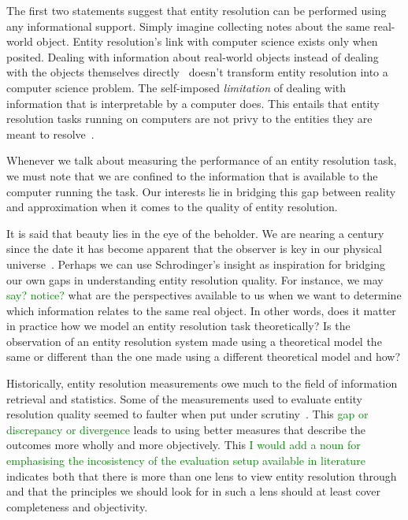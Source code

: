 \documentclass[journal]{IEEEtran}
\begin{document}
    The first two statements suggest that entity resolution can be performed
    using any informational support.
    Simply imagine collecting notes about the same real-world object.
    Entity resolution's link with computer science exists only when posited.
    Dealing with information about real-world objects instead of dealing with
    the objects themselves directly~\cite{Tal11} doesn't transform entity
    resolution into a computer science problem.
    The self-imposed \textit{limitation} of dealing with information that is
    interpretable by a computer does.
    This entails that entity resolution tasks running on computers are not privy
    to the entities they are meant to resolve~\cite{Chen09}.

    Whenever we talk about measuring the performance of an entity resolution
    task, we must note that we are confined to the information that is available
    to the computer running the task.
    Our interests lie in bridging this gap between reality and approximation
    when it comes to the quality of entity resolution.

    It is said that beauty lies in the eye of the beholder.
    We are nearing a century since the date it has become apparent that the
    observer is key in our physical universe~\cite{schrodinger1926}.
    Perhaps we can use Schrodinger's insight as inspiration for bridging our own
    gaps in understanding entity resolution quality.
    For instance, we may 
    \textcolor{green}{say? notice?} 
    what are the perspectives available to us when we want
    to determine which information relates to the same real object.
    In other words, does it matter in practice how we model an entity resolution
    task theoretically?
    Is the observation of an entity resolution system made using a theoretical
    model the same or different than the one made using a different theoretical
    model and how?

    Historically, entity resolution measurements owe much to the field of
    information retrieval and statistics.
    Some of the measurements used to evaluate entity resolution quality seemed
    to faulter when put under scrutiny~\cite{Goga2015}.
    This 
    \textcolor{green}{gap or discrepancy or divergence} 
    leads to using better measures that describe the outcomes more wholly
    and more objectively.
    This 
    \textcolor{green}{I would add a noun for emphasising the incosistency of the evaluation setup available in literature} 
    indicates both that there is more than one lens to view entity
    resolution through and that the principles we should look for in such a lens
    should at least cover completeness and objectivity.
    
\end{document}
